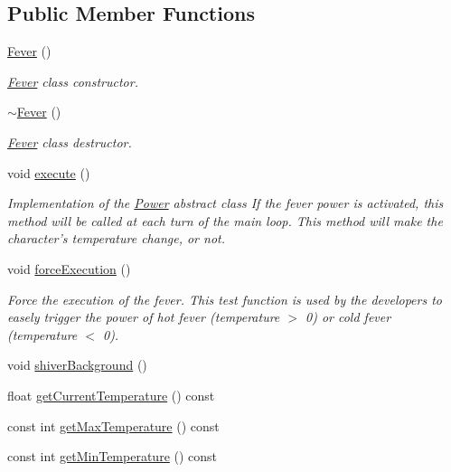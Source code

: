 \subsection*{Public Member Functions}
\begin{DoxyCompactItemize}
\item 
\hyperlink{class_symp_1_1_fever_a4458612b1d9efc07a18f8853fb9a8545}{Fever} ()
\begin{DoxyCompactList}\small\item\em \hyperlink{class_symp_1_1_fever}{Fever} class constructor. \end{DoxyCompactList}\item 
\hyperlink{class_symp_1_1_fever_a9f9a8dc3c26f4a2917a843fd8891c29b}{$\sim$\-Fever} ()
\begin{DoxyCompactList}\small\item\em \hyperlink{class_symp_1_1_fever}{Fever} class destructor. \end{DoxyCompactList}\item 
void \hyperlink{class_symp_1_1_fever_a963f59082a92165475663d3c359ffbf2}{execute} ()
\begin{DoxyCompactList}\small\item\em Implementation of the \hyperlink{class_symp_1_1_power}{Power} abstract class If the fever power is activated, this method will be called at each turn of the main loop. This method will make the character's temperature change, or not. \end{DoxyCompactList}\item 
void \hyperlink{class_symp_1_1_fever_a7dcf044b45ffc3f6ce6096ac9112d6d9}{force\-Execution} ()
\begin{DoxyCompactList}\small\item\em Force the execution of the fever. This test function is used by the developers to easely trigger the power of hot fever (temperature $>$ 0) or cold fever (temperature $<$ 0). \end{DoxyCompactList}\item 
void \hyperlink{class_symp_1_1_fever_ae3d3ca9eb9c4d449b980c59ef8c57a35}{shiver\-Background} ()
\item 
float \hyperlink{class_symp_1_1_fever_accc45e0b79d8ddebbe68e73661f35806}{get\-Current\-Temperature} () const 
\item 
const int \hyperlink{class_symp_1_1_fever_a147995a0b033255e0750602f5bd8fc89}{get\-Max\-Temperature} () const 
\item 
const int \hyperlink{class_symp_1_1_fever_a40d7fedb8a426ea2d20ccacbac33f1ea}{get\-Min\-Temperature} () const 

\end{DoxyCompactItemize}
